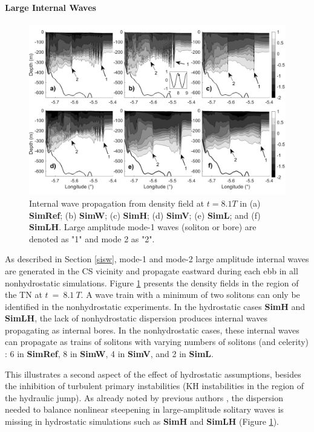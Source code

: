 \paragraph{Large Internal Waves}
\begin{figure}[!h]
  \includegraphics[width=\textwidth]{./GBR2D/figure12.png}
  \caption[Internal wave propagation from density field.]{Internal wave propagation from density field at $t = 8.1 T$ in (a) \textbf{SimRef}; (b) \textbf{SimW}; (c) \textbf{SimH}; (d) \textbf{SimV}; (e) \textbf{SimL}; and (f) \textbf{SimLH}. Large amplitude mode-1 waves (soliton or bore) are denoted as "1" and mode 2 as "2".}
  \label{fig_trains_num}
\end{figure}

As described in Section \ref{sisw}, mode-1 and mode-2 large amplitude internal waves are generated in the CS vicinity and propagate eastward during each ebb in all nonhydrostatic simulations. Figure \ref{fig_trains_num} presents the density fields in the region of the TN at $t\ =\ 8.1\ T$. A wave train with a minimum of two solitons can only be identified in the nonhydrostatic experiments. In the hydrostatic cases \textbf{SimH} and \textbf{SimLH}, the lack of nonhydrostatic dispersion produces internal waves propagating as internal bores. In the nonhydrostatic cases, these internal waves can propagate as trains of solitons with varying numbers of solitons (and celerity) : 6 in \textbf{SimRef}, 8 in \textbf{SimW}, 4 in \textbf{SimV}, and 2 in \textbf{SimL}. 

This illustrates a second aspect of the effect of hydrostatic assumptions, besides the inhibition of turbulent primary instabilities (KH instabilities in the region of the hydraulic jump). As already noted by previous authors \citep{Sannino2004}, the dispersion needed to balance nonlinear steepening in large-amplitude solitary waves is missing in hydrostatic simulations such as \textbf{SimH} and \textbf{SimLH} (Figure \ref{fig_trains_num}).

